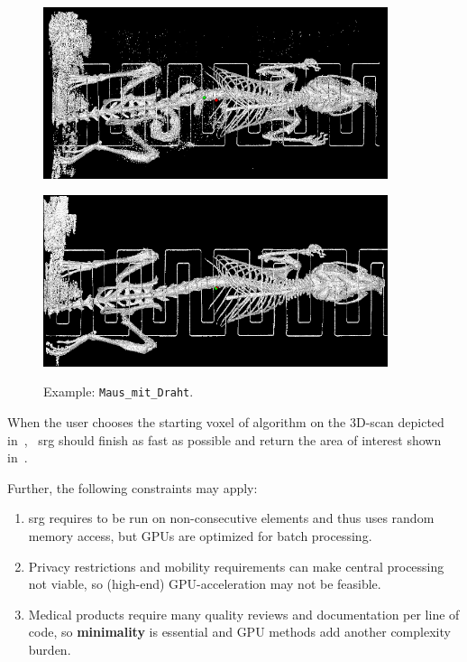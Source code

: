 \documentclass{article}
\begin{document}
\begin{figure}[h!]
\centering \vskip 0pt
\begin{minipage}[t]{0.5\textwidth}%
  \centering \vskip 0pt
  \includegraphics[width=0.9\textwidth]{images/maus_mit_draht_unprocessed.png}
  \label{fig:mausmitdraht_unprocexa}
\end{minipage}%
\begin{minipage}[t]{0.5\textwidth}%
  \centering \vskip 0pt
  \includegraphics[width=0.9\textwidth]{images/maus_mit_draht_processed.png}
  \label{fig:mausmitdraht_procexa}
\end{minipage}%
  \caption{Example: \texttt{Maus\_mit\_Draht}.}
\end{figure}%

When the user chooses the starting voxel of algorithm on the 3D-scan depicted in~,
~\ac{srg} should finish as fast as possible and return the area of interest shown in~.\par
Further, the following constraints may apply:
\begin{enumerate}
  \item \Ac{srg} requires to be run on non-consecutive elements and thus uses random memory access, but GPUs are optimized for batch processing.
  \item Privacy restrictions and mobility requirements can make central processing not viable, so (high-end) GPU-acceleration may not be feasible.
  \item Medical products require many quality reviews and documentation per line of code, so \textbf{minimality} is essential and GPU methods add another complexity burden.
\end{enumerate}
\end{document}
